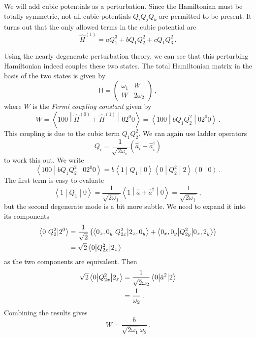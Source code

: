 \documentclass{article}
\theoremstyle{plain}\theoremheaderfont{\normalfont\itshape}\theorembodyfont{\rmfamily}\theoremseparator{.}\newtheorem*{rem}{Remark}\newtheorem*{ex}{Example}\newtheorem*{proof}{Proof}\newtheorem*{altp}{Alternative proof}
\theoremstyle{plain}\theoremheaderfont{\normalfont\bfseries}\theorembodyfont{\rmfamily}\theoremseparator{.}\newtheorem{thm}{Theorem}[section]\newtheorem{lem}[thm]{Lemma}\newtheorem{prop}[thm]{Proposition}\newtheorem*{cor}{Corollary}\newtheorem{defn}[thm]{Definition}\newtheorem{clm}[thm]{Claim}\newtheorem{clminproof}{Claim}
\theoremstyle{break}\theoremheaderfont{\normalfont\itshape}\theorembodyfont{\rmfamily}\theoremseparator{.\medskip}\newtheorem*{proofskip}{Proof}\newtheorem*{exs}{Examples}\newtheorem*{rems}{Remarks}
\theoremstyle{break}\theoremheaderfont{\normalfont\bfseries}\theorembodyfont{\rmfamily}\theoremseparator{.\medskip}\newtheorem{lemskip}[thm]{Lemma}\newtheorem{defnskip}[thm]{Definition}\newtheorem{propskip}[thm]{Proposition}\newtheorem{thmskip}[thm]{Theorem}
\numberwithin{equation}{section}
\newcommand{\braket}[2]{\left\langle #1 \middle| #2 \right\rangle}
\newcommand{\mel}[3]{\left\langle #1 \middle| #2 \middle| #3 \right\rangle}
\begin{document}
    We will add cubic potentials as a perturbation. Since the Hamiltonian must be totally symmetric, not all cubic potentials \(Q_iQ_jQ_k\) are permitted to be present. It turns out that the only allowed terms in the cubic potential are
    \begin{equation}
        \hat{H}^{(1)}=aQ_1^3+bQ_1Q_2^2+cQ_1Q_3^2\,.
    \end{equation}

    Using the nearly degenerate perturbation theory, we can see that this perturbing Hamiltonian indeed couples these two states. The total Hamiltonian matrix in the basis of the two states is given by
    \begin{equation}
        \mathsf{H}=\begin{pmatrix}
            \omega_1 & W \\
            W & 2\omega_2
        \end{pmatrix}\,,
    \end{equation}
    where \(W\) is the \textit{Fermi coupling constant} given by
    \begin{equation}
        W=\mel{100}{\hat{H}^{(0)}+\hat{H}^{(1)}}{02^0 0}=\mel{100}{bQ_1Q_2^2}{02^0 0}\,.
    \end{equation}
    This coupling is due to the cubic term \(Q_1Q_2^2\). We can again use ladder operators
    \begin{equation}
        Q_i=\frac{1}{\sqrt{2\omega_i}}(\hat{a}_i+\hat{a}_i^\dagger)
    \end{equation}
    to work this out. We write
    \begin{equation}
        \mel{100}{bQ_1Q_2^2}{02^0 0}=b\mel{1}{Q_1}{0}\mel{0}{Q_2^2}{2}\braket{0}{0}\,.
    \end{equation}
    The first term is easy to evaluate
    \begin{equation}
        \mel{1}{Q_1}{0}=\frac{1}{\sqrt{2\omega_1}}\mel{1}{\hat{a}+\hat{a}^\dagger}{0}=\frac{1}{\sqrt{2\omega_1}}\,,
    \end{equation}
    but the second degenerate mode is a bit more subtle. We need to expand it into its components
    \begin{align}
        \mel{0}{Q_2^2}{2^0}&=\frac{1}{\sqrt{2}}\left(\mel{0_x,0_y}{Q_{2x}^2}{2_x,0_y}+\mel{0_x,0_y}{Q_{2y}^2}{0_x,2_y}\right)\notag\\
        &=\sqrt{2}\mel{0}{Q_{2x}^2}{2_x}
    \end{align}
    as the two components are equivalent. Then
    \begin{align}
        \sqrt{2}\mel{0}{Q_{2x}^2}{2_x}&=\frac{1}{\sqrt{2}\omega_2}\mel{0}{\hat{a}^2}{2}\notag\\
        &=\frac{1}{\omega_2}\,.
    \end{align}
    Combining the results gives
    \begin{equation}
        W=\frac{b}{\sqrt{2\omega_1}\omega_2}\,.
    \end{equation}
    
\end{document}
